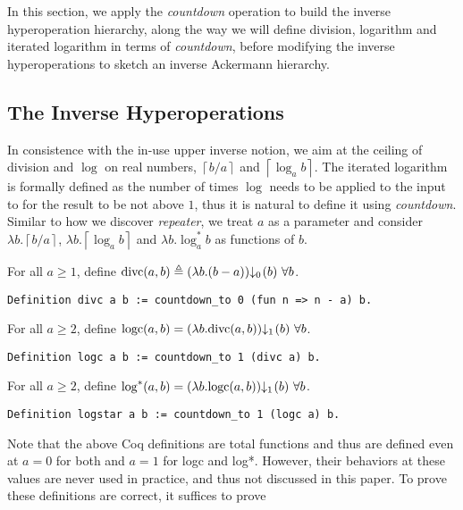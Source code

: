 In this section, we apply the \emph{countdown} operation to build the inverse hyperoperation hierarchy, along the way we will define division, logarithm and iterated logarithm in terms of \emph{countdown}, before modifying the inverse hyperoperations to sketch an inverse Ackermann hierarchy.

\subsection{The Inverse Hyperoperations}
In consistence with the in-use upper inverse notion, we aim at the ceiling of division and $\log$ on real numbers, $\left\lceil b/a \right\rceil$ and $\left\lceil \log_ab \right\rceil$. The iterated logarithm is formally defined as the number of times $\log$ needs to be applied to the input to for the result to be not above $1$, thus it is natural to define it using \emph{countdown}.
Similar to how we discover \emph{repeater}, we treat $a$ as a parameter and consider $\lambda b.\left\lceil b/a \right\rceil$, $\lambda b.\left\lceil \log_ab \right\rceil$ and $\lambda b. \log^*_ab$ as functions of $b$. 
\begin{defn} \label{defn: divc}
	For all $a\ge 1$, define $\divc(a, b) \triangleq \cdt{\left(\lambda b. (b-a)\right)}{0}(b) \ \forall b$.
\begin{lstlisting}
Definition divc a b := countdown_to 0 (fun n => n - a) b.
\end{lstlisting}\vspace*{-0.5\baselineskip}
\end{defn}
\begin{defn} \label{defn: logc}
	For all $a\ge 2$, define $\logc(a, b) = \cdt{\left(\lambda b. \divc(a, b)\right)}{1}(b) \ \forall b$.
\begin{lstlisting}
Definition logc a b := countdown_to 1 (divc a) b.
\end{lstlisting}\vspace*{-0.5\baselineskip}
\end{defn}
\begin{defn} \label{defn: log*}
	For all $a\ge 2$, define $\log^*(a, b) = \cdt{\left(\lambda b. \logc(a, b)\right)}{1}(b) \ \forall b$.
\begin{lstlisting}
Definition logstar a b := countdown_to 1 (logc a) b.
\end{lstlisting}\vspace*{-0.5\baselineskip}
\end{defn}
Note that the above Coq definitions are total functions and thus are defined even at $a = 0$ for both and $a = 1$ for logc and log*. However, their behaviors at these values are never used in practice, and thus not discussed in this paper. To prove these definitions are correct, it suffices to prove

